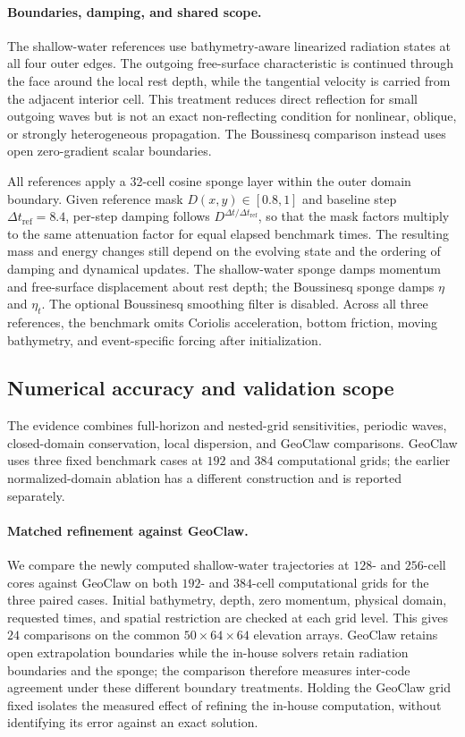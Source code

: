 \paragraph{Boundaries, damping, and shared scope.}
The shallow-water references use bathymetry-aware linearized radiation states at all four outer edges. The outgoing free-surface characteristic is continued through the face around the local rest depth, while the tangential velocity is carried from the adjacent interior cell. This treatment reduces direct reflection for small outgoing waves but is not an exact non-reflecting condition for nonlinear, oblique, or strongly heterogeneous propagation. The Boussinesq comparison instead uses open zero-gradient scalar boundaries.

All references apply a 32-cell cosine sponge layer within the outer domain boundary. Given reference mask $D(x, y) \in [0.8, 1]$ and baseline step $\Delta t_{\mathrm{ref}} = 8.4$, per-step damping follows $D^{\Delta t/\Delta t_{\mathrm{ref}}}$, so that the mask factors multiply to the same attenuation factor for equal elapsed benchmark times. The resulting mass and energy changes still depend on the evolving state and the ordering of damping and dynamical updates. The shallow-water sponge damps momentum and free-surface displacement about rest depth; the Boussinesq sponge damps $\eta$ and $\eta_t$. The optional Boussinesq smoothing filter is disabled. Across all three references, the benchmark omits Coriolis acceleration, bottom friction, moving bathymetry, and event-specific forcing after initialization.

\subsection{Numerical accuracy and validation scope}
\label{subsec:reference-validation}

The evidence combines full-horizon and nested-grid sensitivities, periodic waves, closed-domain conservation, local dispersion, and GeoClaw comparisons. GeoClaw uses three fixed benchmark cases at $192$ and $384$ computational grids; the earlier normalized-domain ablation has a different construction and is reported separately.

\paragraph{Matched refinement against GeoClaw.}
We compare the newly computed shallow-water trajectories at $128$- and $256$-cell cores against GeoClaw on both $192$- and $384$-cell computational grids for the three paired cases. Initial bathymetry, depth, zero momentum, physical domain, requested times, and spatial restriction are checked at each grid level. This gives $24$ comparisons on the common $50 \times 64 \times 64$ elevation arrays. GeoClaw retains open extrapolation boundaries while the in-house solvers retain radiation boundaries and the sponge; the comparison therefore measures inter-code agreement under these different boundary treatments. Holding the GeoClaw grid fixed isolates the measured effect of refining the in-house computation, without identifying its error against an exact solution.

